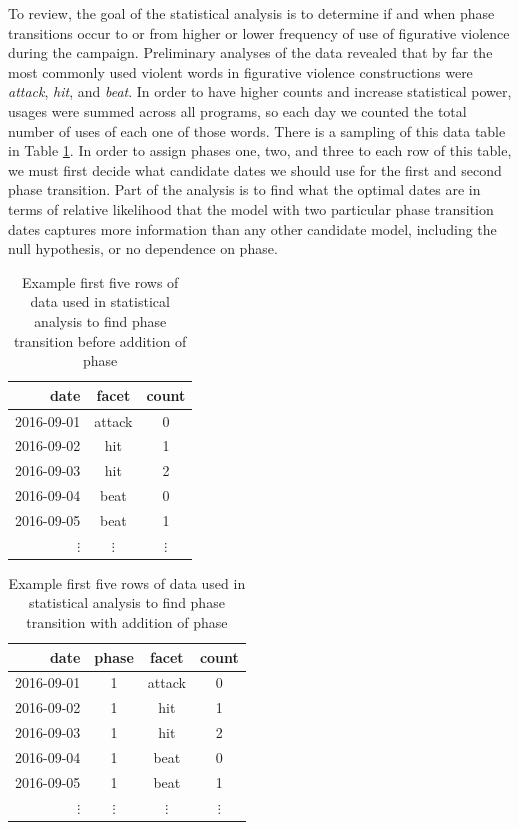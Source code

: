 To review, the goal of the statistical analysis is to determine if and when
phase transitions occur to or from higher or lower frequency of use 
of figurative violence
during the campaign. Preliminary analyses of the data revealed that by far
the most commonly used violent words in figurative violence constructions were
\textit{attack}, \textit{hit}, and \textit{beat}. In order to have higher 
counts and increase statistical power, usages were summed across all programs,
so each day we counted the total number of uses of each one of those words.
There is a sampling of this data table in Table \ref{tab:sample-data}. In 
order to assign phases one, two, and three to each row of this table, we
must first decide what candidate dates we should use for the first and
second phase transition. Part of the analysis is to find what the optimal 
dates are in terms of relative likelihood that the model with two particular
phase transition dates captures more information than any other candidate
model, including the null hypothesis, or no dependence on phase.

\begin{table}[ht]
    \centering
    \begin{tabular}{|r|cc|}
        \hline
        date       &   facet    &  count     \\
        \hline
        2016-09-01 &     attack &    0     \\
        2016-09-02 &     hit    &    1     \\
        2016-09-03 &     hit    &    2     \\
        2016-09-04 &     beat   &    0     \\
        2016-09-05 &     beat   &    1     \\
        $\vdots$   &  $\vdots$  & $\vdots$ \\
    \end{tabular}
    \caption{Example first five rows of data used in statistical analysis to find
    phase transition before addition of phase}
    \label{tab:sample-data}
\end{table}

\begin{table}[ht]
    \centering
    \begin{tabular}{|r|ccc|}
        \hline
        date       &  phase  &   facet    &  count     \\
        \hline               
        2016-09-01 &    1    &     attack &    0     \\
        2016-09-02 &    1    &     hit    &    1     \\
        2016-09-03 &    1    &     hit    &    2     \\
        2016-09-04 &    1    &     beat   &    0     \\
        2016-09-05 &    1    &     beat   &    1     \\
        $\vdots$   & $\vdots$&  $\vdots$  & $\vdots$ \\
    \end{tabular}
    \caption{Example first five rows of data used in statistical analysis to find
    phase transition with addition of phase}
    \label{tab:sample-data-wphase}
\end{table}


